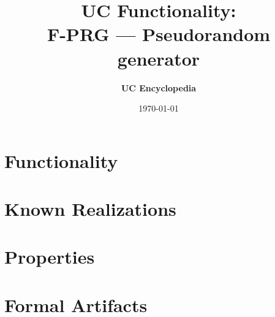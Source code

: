 \documentclass[11pt,a4paper]{article}
\title{\textbf{\Large UC Functionality:}\\[0.2em] \Large F-PRG --- Pseudorandom generator}
\author{\textbf{UC Encyclopedia}}
\date{\today}
\newtheorem{functionality}{Functionality}
\begin{document}
\maketitle

\begin{abstract}
\end{abstract}

\section{Functionality}

%

\section{Known Realizations}


\section{Properties}


\section{Formal Artifacts}

\end{document}
